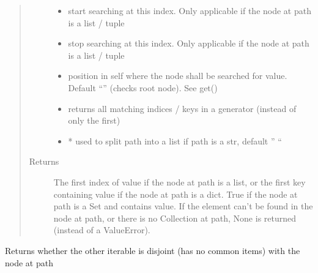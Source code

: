 \documentclass[a4paper,10pt,english]{sphinxmanual}
\begin{document}
\begin{fulllineitems}
\begin{fulllineitems}
\begin{quote}
\begin{description}
\begin{itemize}
\item {}
\sphinxAtStartPar
{} \textendash{} start searching at this index. Only applicable if the node at path is a list / tuple

\item {}
\sphinxAtStartPar
{} \textendash{} stop searching at this index. Only applicable if the node at path is a list / tuple

\item {}
\sphinxAtStartPar
{} \textendash{} position in self where the node shall be searched for value. Default “” (checks root node). See get()

\item {}
\sphinxAtStartPar
{} \textendash{} returns all matching indices / keys in a generator (instead of only the first)

\item {}
\sphinxAtStartPar
{} \textendash{} * used to split path into a list if path is a str, default ” “

\end{itemize}

\item[{Returns}] \leavevmode
\sphinxAtStartPar
The first index of value if the node at path is a list, or the first key containing value if the node at
path is a dict. True if the node at path is a Set and contains value. If the element can’t be found in the
node at path, or there is no Collection at path, None is returned (instead of a ValueError).

\end{description}\end{quote}

\end{fulllineitems}


\begin{fulllineitems}
\label{\detokenize{fagus:fagus.Fagus.isdisjoint}}
\pysigstartsignatures
{}
\pysigstopsignatures
\sphinxAtStartPar
Returns whether the other iterable is disjoint (has no common items) with the node at path


\end{fulllineitems}
\end{fulllineitems}
\end{document}
